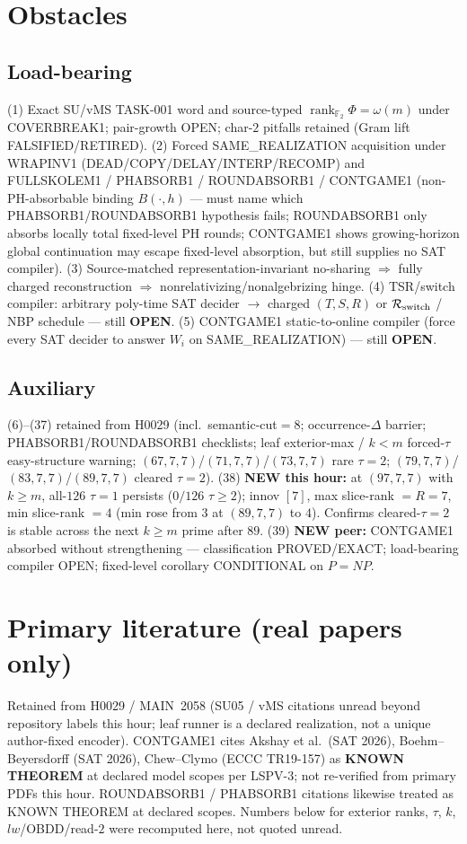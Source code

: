 \documentclass[11pt]{article}
\begin{document}
\section*{Obstacles}
\subsection*{Load-bearing}
(1) Exact SU/vMS TASK-001 word and source-typed
$\operatorname{rank}_{\mathbb F_2}\Phi=\omega(m)$ under COVERBREAK1; pair-growth OPEN;
char-$2$ pitfalls retained (Gram lift FALSIFIED/RETIRED).
(2) Forced SAME\_REALIZATION acquisition under WRAPINV1
(DEAD/COPY/DELAY/INTERP/RECOMP) and FULLSKOLEM1 / PHABSORB1 / ROUNDABSORB1 / CONTGAME1
(non-PH-absorbable binding $B(\cdot,h)$ --- must name which PHABSORB1/ROUNDABSORB1
hypothesis fails; ROUNDABSORB1 only absorbs locally total fixed-level PH rounds;
CONTGAME1 shows growing-horizon global continuation may escape fixed-level absorption,
but still supplies no SAT compiler).
(3) Source-matched representation-invariant no-sharing $\Rightarrow$ fully charged reconstruction
$\Rightarrow$ nonrelativizing/nonalgebrizing hinge.
(4) TSR/switch compiler: arbitrary poly-time SAT decider $\to$ charged $(T,S,R)$ or
$\mathcal R_{\rm switch}$ / NBP schedule --- still \textbf{OPEN}.
(5) CONTGAME1 static-to-online compiler (force every SAT decider to answer $W_i$ on
SAME\_REALIZATION) --- still \textbf{OPEN}.

\subsection*{Auxiliary}
(6)--(37) retained from H0029 (incl.\ semantic-cut$=8$; occurrence-$\Delta$ barrier;
PHABSORB1/ROUNDABSORB1 checklists; leaf exterior-max / $k{<}m$ forced-$\tau$ easy-structure warning;
$(67,7,7)$/$(71,7,7)$/$(73,7,7)$ rare $\tau{=}2$; $(79,7,7)$/$(83,7,7)$/$(89,7,7)$ cleared $\tau{=}2$).
(38) \textbf{NEW this hour:} at $(97,7,7)$ with $k{\ge}m$, all-$126$ $\tau{=}1$ persists
($0/126$ $\tau{\ge}2$); innov $[7]$, max slice-rank $=R{=}7$, min slice-rank $=4$
(min rose from $3$ at $(89,7,7)$ to $4$). Confirms cleared-$\tau{=}2$
is stable across the next $k{\ge}m$ prime after $89$.
(39) \textbf{NEW peer:} CONTGAME1 absorbed without strengthening --- classification
PROVED/EXACT; load-bearing compiler OPEN; fixed-level corollary CONDITIONAL on $P=NP$.

\section*{Primary literature (real papers only)}
Retained from H0029 / MAIN~2058 (SU05 / vMS citations unread beyond repository labels this hour;
leaf runner is a declared realization, not a unique author-fixed encoder).
CONTGAME1 cites Akshay et al.\ (SAT 2026), Boehm--Beyersdorff (SAT 2026),
Chew--Clymo (ECCC TR19-157) as \textbf{KNOWN THEOREM} at declared model scopes per LSPV-3;
not re-verified from primary PDFs this hour.
ROUNDABSORB1 / PHABSORB1 citations likewise treated as KNOWN THEOREM at declared scopes.
Numbers below for exterior ranks, $\tau$, $k$, $lw$/OBDD/read-$2$
were recomputed here, not quoted unread.
\end{document}
